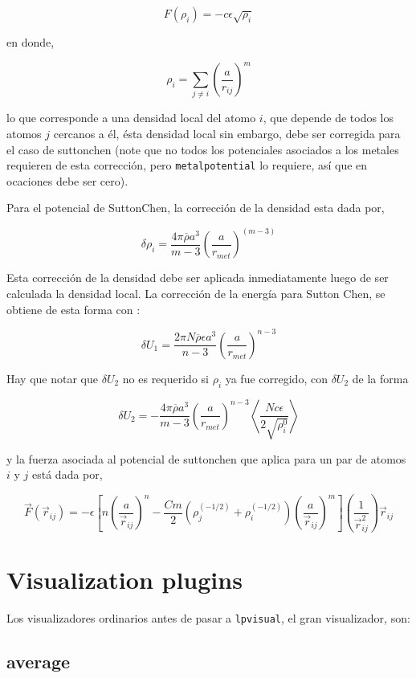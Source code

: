 $$F(\rho_{i}) = -c\epsilon\sqrt{\rho_i}$$

en donde,

$$\rho_i = \sum_{j\neq i} \left(\frac{a}{r_{ij}}\right)^m$$

lo que corresponde a una densidad local del atomo $i$, que depende de todos los
atomos $j$ cercanos a \'el, \'esta densidad local sin embargo, debe ser
corregida para el caso de suttonchen (note que no todos los potenciales
asociados a los metales requieren de esta correcci\'on, pero
\verb|metalpotential| lo requiere, as\'i que en ocaciones debe ser cero).

Para el potencial de SuttonChen, la correcci\'on de la densidad esta dada por,

$$\delta\rho_i=\frac{4\pi\overline{\rho}a^3}{m-3}\left(\frac{a}{r_{met}}\right)^
{(m-3)}$$

Esta correcci\'on de la densidad debe ser aplicada inmediatamente luego de ser
calculada la densidad local. La correcci\'on de la energ\'ia para Sutton Chen,
se obtiene de esta forma con :

$$\delta U_1 = \frac{2\pi N\overline{\rho}\epsilon
a^3}{n-3}\left(\frac{a}{r_{met}}\right)^{n-3}$$

Hay que notar que $\delta U_2$ no es requerido si $\rho_i$ ya fue corregido, con
$\delta U_2$ de la forma

$$\delta U_2 =
-\frac{4\pi\overline{\rho}a^3}{m-3}\left(\frac{a}{r_{met}}\right)^{n-3}
\left<\frac{Nc\epsilon}{2\sqrt{\rho_i^0}}\right>$$

y la fuerza asociada al potencial de suttonchen que aplica para un par de atomos
$i$ y $j$ est\'a dada por,

$$\vec{F}(\vec{r}_{ij}) = -\epsilon\left[n\left(\frac{a}{\vec{r}_{ij}}\right)^n
-
\frac{Cm}{2}(\rho_j^{(-1/2)}+\rho_i^{(-1/2)})\left(\frac{a}{\vec{r}_{ij}}
\right)^m\right]\left(\frac{1}{\vec{r}_{ij}^2}\right)\vec{r}_{ij}$$



\section{Visualization plugins}
Los visualizadores ordinarios antes de pasar a \verb|lpvisual|, el gran
visualizador, son:

\subsection {average}

